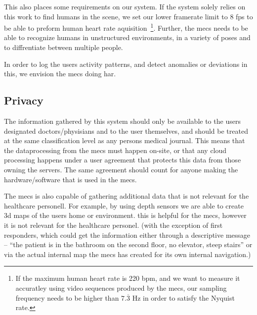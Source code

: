 This also places some requirements on our system. If the system solely relies on this work to find humans in the scene, we set our lower framerate limit to 8 fps to be able to preform human heart rate aquisition~\cite{Wu12Eulerian}\footnote{If the maximum human heart rate is 220 bpm, and we want to measure it accuratley using video sequences produced by the \gls{mecs}, our sampling frequency needs to be higher than $7.\overline{3}$ Hz in order to satisfy the Nyquist rate.}. Further, the \gls{mecs} needs to be able to recognize humans in unstructured environments, in a variety of poses and to diffrentiate between multiple people.

In order to log the users activity patterns, and detect anomalies or deviations in this, we envision the \gls{mecs} doing \gls{har}.

\subsection{Privacy}
The information gathered by this system should only be available to the users designated doctors/physisians and to the user themselves, and should be treated at the same classification level as any persons medical journal. This means that the dataprocessing from the \gls{mecs} must happen on-site, or that any cloud processing happens under a user agreement that protects this data from those owning the servers. The same agreement should count for anyone making the hardware/software that is used in the \gls{mecs}.

The \gls{mecs} is also capable of gathering additional data that is not relevant for the healthcare personell. For example, by using depth sensors we are able to create 3d maps of the users home or environment. this is helpful for the \gls{mecs}, however it is not relevant for the healthcare personel. (with the exception of first responders, which could get the information either through a descriptive message -- ``the patient is in the bathroom on the second floor, no elevator, steep stairs'' or via the actual internal map the \gls{mecs} has created for its own internal navigation.)

